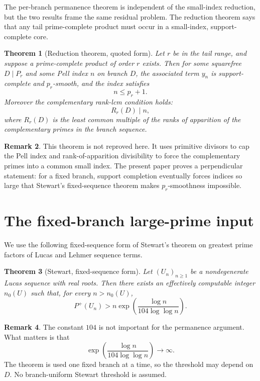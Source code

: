 \documentclass[11pt]{article}
\newtheorem{theorem}{Theorem}[section]
\theoremstyle{definition}
\newtheorem{remark}[theorem]{Remark}
\newcommand{\Pplus}{P^{+}}
\begin{document}
The per-branch permanence theorem is independent of the small-index reduction,
but the two results frame the same residual problem.  The reduction theorem says
that any tail prime-complete product must occur in a small-index, support-complete
core.

\begin{theorem}[Reduction theorem, quoted form]\label{thm:reduction-context}
Let $r$ be in the tail range, and suppose a prime-complete product of order $r$
exists.  Then for some squarefree $D\mid P_r$ and some Pell index $n$ on branch
$D$, the associated term $y_n$ is support-complete and $p_r$-smooth, and the
index satisfies
\[
  n\le p_r+1.
\]
Moreover the complementary rank-lcm condition holds:
\[
  R_r(D)\mid n,
\]
where $R_r(D)$ is the least common multiple of the ranks of apparition of the
complementary primes in the branch sequence.
\end{theorem}

\begin{remark}
This theorem is not reproved here.  It uses primitive divisors to cap the Pell
index and rank-of-apparition divisibility to force the complementary primes into
a common small index.  The present paper proves a perpendicular statement: for a
fixed branch, support completion eventually forces indices so large that
Stewart's fixed-sequence theorem makes $p_r$-smoothness impossible.
\end{remark}

\section{The fixed-branch large-prime input}

We use the following fixed-sequence form of Stewart's theorem on greatest prime
factors of Lucas and Lehmer sequence terms.

\begin{theorem}[Stewart, fixed-sequence form]\label{thm:stewart}
Let $(U_n)_{n\ge1}$ be a nondegenerate Lucas sequence with real roots.  Then
there exists an effectively computable integer $n_0(U)$ such that, for every
$n>n_0(U)$,
\[
  \Pplus(U_n)
  >
  n\exp\!\left(\frac{\log n}{104\log\log n}\right).
\]
\end{theorem}

\begin{remark}
The constant $104$ is not important for the permanence argument.  What matters is
that
\[
  \exp\!\left(\frac{\log n}{104\log\log n}\right)\to\infty.
\]
The theorem is used one fixed branch at a time, so the threshold may depend on
$D$.  No branch-uniform Stewart threshold is assumed.
\end{remark}
\end{document}
